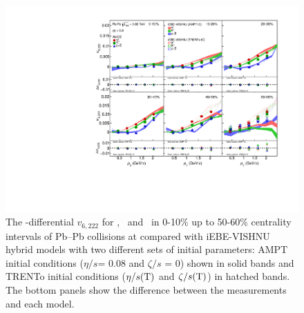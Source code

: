 \begin{figure}[h]
\begin{center}
\includegraphics[scale=0.73]{figures/model/TrentoAndAMPT_v6222_gap00_PID2.pdf}
\end{center}
\caption{The \pT-differential $v_{6,222}$ for \pion, \kaon~and \proton~in 0-10\% up to 50-60\% centrality intervals of Pb--Pb collisions at \sNN compared with iEBE-VISHNU hybrid models with two different sets of initial parameters: AMPT initial conditions ($\eta/s$= 0.08 and $\zeta/s$ = 0) shown in solid bands and TRENTo initial conditions ($\eta/s({\rm T})$ and $\zeta/s({\rm T})$) in hatched bands. The bottom panels show the difference between the measurements and each model.}
\label{v6222_model}
\end{figure}



